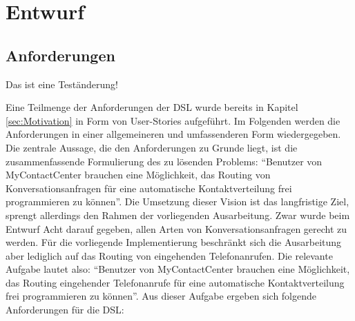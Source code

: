 \chapter{Entwurf}
\label{chap:Entwurf}

\section{Anforderungen}
Das ist eine Teständerung!


Eine Teilmenge der Anforderungen der DSL wurde bereits in Kapitel \ref{sec:Motivation} in Form von User-Stories aufgeführt. Im Folgenden werden die Anforderungen in einer allgemeineren und umfassenderen Form wiedergegeben. Die zentrale Aussage, die den Anforderungen zu Grunde liegt, ist die zusammenfassende Formulierung des zu lösenden Problems: ``Benutzer von MyContactCenter brauchen eine Möglichkeit, das Routing von Konversationsanfragen für eine automatische Kontaktverteilung frei programmieren zu können''. Die Umsetzung dieser Vision ist das langfristige Ziel, sprengt allerdings den Rahmen der vorliegenden Ausarbeitung. Zwar wurde beim Entwurf Acht darauf gegeben, allen Arten von Konversationsanfragen gerecht zu werden. Für die vorliegende Implementierung beschränkt sich die Ausarbeitung aber lediglich auf das Routing von eingehenden Telefonanrufen. Die relevante Aufgabe lautet also: ``Benutzer von MyContactCenter brauchen eine Möglichkeit, das Routing eingehender Telefonanrufe für eine automatische Kontaktverteilung frei programmieren zu können''.
\newline
Aus dieser Aufgabe ergeben sich folgende Anforderungen für die DSL:
